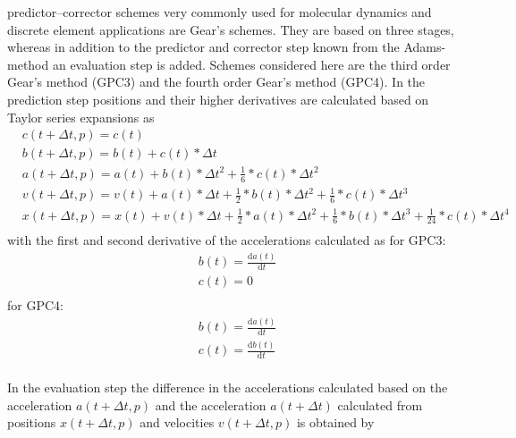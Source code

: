 \par
predictor–corrector schemes very commonly used for molecular dynamics and discrete element
applications are Gear’s schemes. They are based on three stages, whereas in addition to the
predictor and corrector step known from the Adams-method an evaluation step is added. Schemes
considered here are the third order Gear’s method (GPC3) and the fourth order Gear’s method (GPC4).
In the prediction step positions and their higher derivatives are calculated based on Taylor series
expansions as
\begin{equation}\label{eqn:gearP}
    \begin{split}
        &c(t+\Delta t, p) = c(t)\\
        &b(t+\Delta t, p) = b(t) + c(t) *\Delta t\\
        &a(t+\Delta t, p) = a(t) + b(t) *\Delta t^2 + \frac{1}{6} * c(t) *\Delta t^2\\
        &v(t+\Delta t, p) = v(t) + a(t) *\Delta t + \frac{1}{2} * b(t) *\Delta t^2 + \frac{1}{6} * c(t) *\Delta t^3\\
        &x(t+\Delta t, p) = x(t) + v(t) * \Delta t + \frac{1}{2} * a(t) *\Delta t^2 + \frac{1}{6} * b(t) *\Delta t^3 + \frac{1}{24} * c(t) *\Delta t^4\\
    \end{split}
\end{equation}
with the first and second derivative of the accelerations calculated as
for GPC3:
\begin{equation}\label{eqn:gearJerk3}
    \begin{split}
        &b(t) = \frac{\mathrm d a(t)}{\mathrm d t}\\
        &c(t) = 0\\
    \end{split}
\end{equation}
for GPC4:
\begin{equation}\label{eqn:gearJerk4}
    \begin{split}
        &b(t) = \frac{\mathrm d a(t)}{\mathrm d t}\\
        &c(t) = \frac{\mathrm d b(t)}{\mathrm d t}\\
    \end{split}
\end{equation}
\par
In the evaluation step the difference in the accelerations calculated based on the acceleration
$a(t+ \Delta t, p)$ and the acceleration $a(t+\Delta t)$ calculated from positions $x(t+\Delta t, p)$ and velocities $v(t+\Delta t, p)$ is obtained by
